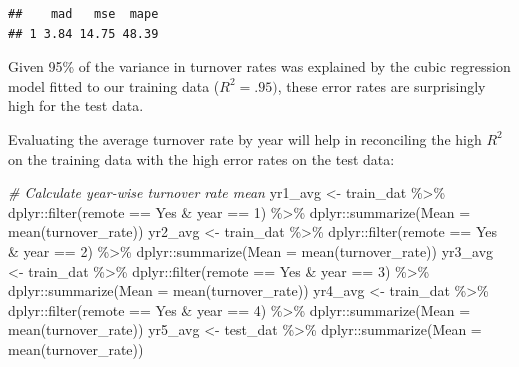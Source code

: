 \documentclass[
]{book}
\newenvironment{Shaded}{\begin{snugshade}}{\end{snugshade}}
\newcommand{\AttributeTok}[1]{\textcolor[rgb]{0.77,0.63,0.00}{#1}}
\newcommand{\CommentTok}[1]{\textcolor[rgb]{0.56,0.35,0.01}{\textit{#1}}}
\newcommand{\DecValTok}[1]{\textcolor[rgb]{0.00,0.00,0.81}{#1}}
\newcommand{\FunctionTok}[1]{\textcolor[rgb]{0.00,0.00,0.00}{#1}}
\newcommand{\NormalTok}[1]{#1}
\newcommand{\OtherTok}[1]{\textcolor[rgb]{0.56,0.35,0.01}{#1}}
\newcommand{\SpecialCharTok}[1]{\textcolor[rgb]{0.00,0.00,0.00}{#1}}
\newcommand{\StringTok}[1]{\textcolor[rgb]{0.31,0.60,0.02}{#1}}
\begin{document}
\begin{verbatim}
##    mad   mse  mape
## 1 3.84 14.75 48.39
\end{verbatim}

Given 95\% of the variance in turnover rates was explained by the cubic regression model fitted to our training data (\(R^2 = .95)\), these error rates are surprisingly high for the test data.

Evaluating the average turnover rate by year will help in reconciling the high \(R^2\) on the training data with the high error rates on the test data:

\begin{Shaded}
\begin{Highlighting}[]
\CommentTok{\# Calculate year{-}wise turnover rate mean}
\NormalTok{yr1\_avg }\OtherTok{\textless{}{-}}\NormalTok{ train\_dat }\SpecialCharTok{\%\textgreater{}\%}\NormalTok{ dplyr}\SpecialCharTok{::}\FunctionTok{filter}\NormalTok{(remote }\SpecialCharTok{==} \StringTok{\textquotesingle{}Yes\textquotesingle{}} \SpecialCharTok{\&}\NormalTok{ year }\SpecialCharTok{==} \DecValTok{1}\NormalTok{) }\SpecialCharTok{\%\textgreater{}\%}\NormalTok{ dplyr}\SpecialCharTok{::}\FunctionTok{summarize}\NormalTok{(}\AttributeTok{Mean =} \FunctionTok{mean}\NormalTok{(turnover\_rate))}
\NormalTok{yr2\_avg }\OtherTok{\textless{}{-}}\NormalTok{ train\_dat }\SpecialCharTok{\%\textgreater{}\%}\NormalTok{ dplyr}\SpecialCharTok{::}\FunctionTok{filter}\NormalTok{(remote }\SpecialCharTok{==} \StringTok{\textquotesingle{}Yes\textquotesingle{}} \SpecialCharTok{\&}\NormalTok{ year }\SpecialCharTok{==} \DecValTok{2}\NormalTok{) }\SpecialCharTok{\%\textgreater{}\%}\NormalTok{ dplyr}\SpecialCharTok{::}\FunctionTok{summarize}\NormalTok{(}\AttributeTok{Mean =} \FunctionTok{mean}\NormalTok{(turnover\_rate))}
\NormalTok{yr3\_avg }\OtherTok{\textless{}{-}}\NormalTok{ train\_dat }\SpecialCharTok{\%\textgreater{}\%}\NormalTok{ dplyr}\SpecialCharTok{::}\FunctionTok{filter}\NormalTok{(remote }\SpecialCharTok{==} \StringTok{\textquotesingle{}Yes\textquotesingle{}} \SpecialCharTok{\&}\NormalTok{ year }\SpecialCharTok{==} \DecValTok{3}\NormalTok{) }\SpecialCharTok{\%\textgreater{}\%}\NormalTok{ dplyr}\SpecialCharTok{::}\FunctionTok{summarize}\NormalTok{(}\AttributeTok{Mean =} \FunctionTok{mean}\NormalTok{(turnover\_rate))}
\NormalTok{yr4\_avg }\OtherTok{\textless{}{-}}\NormalTok{ train\_dat }\SpecialCharTok{\%\textgreater{}\%}\NormalTok{ dplyr}\SpecialCharTok{::}\FunctionTok{filter}\NormalTok{(remote }\SpecialCharTok{==} \StringTok{\textquotesingle{}Yes\textquotesingle{}} \SpecialCharTok{\&}\NormalTok{ year }\SpecialCharTok{==} \DecValTok{4}\NormalTok{) }\SpecialCharTok{\%\textgreater{}\%}\NormalTok{ dplyr}\SpecialCharTok{::}\FunctionTok{summarize}\NormalTok{(}\AttributeTok{Mean =} \FunctionTok{mean}\NormalTok{(turnover\_rate))}
\NormalTok{yr5\_avg }\OtherTok{\textless{}{-}}\NormalTok{ test\_dat }\SpecialCharTok{\%\textgreater{}\%}\NormalTok{ dplyr}\SpecialCharTok{::}\FunctionTok{summarize}\NormalTok{(}\AttributeTok{Mean =} \FunctionTok{mean}\NormalTok{(turnover\_rate))}


\end{Highlighting}
\end{Shaded}
\end{document}
